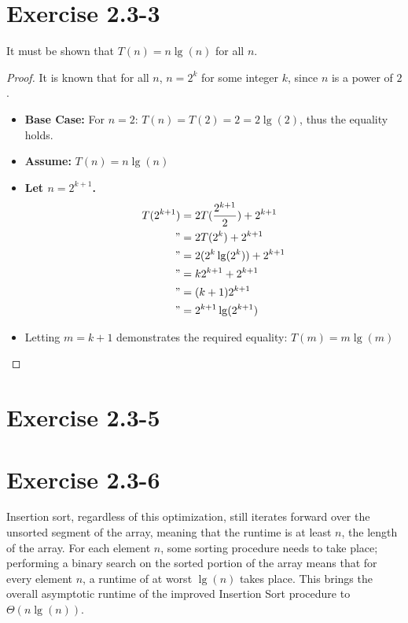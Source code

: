 \documentclass[11pt]{article}
\begin{document}
\section*{Exercise 2.3-3}
It must be shown that $T(n) = n \lg(n)$ for all $n$.
\begin{proof}
	It is known that for all $n$, $n = 2^k$ for some integer $k$, since $n$ is a power of $2$.
	\begin{itemize}
		\item{ \textbf{Base Case:} For $n = 2$: $T(n) = T(2) = 2 = 2 \lg(2)$, thus the equality holds. }
		\item{ \textbf{Assume:} $T(n) = n \lg(n)$ }
		\item{ \textbf{Let $n = 2^{k+1}$.} }
		\begin{align*}
		T(2^{k+1}) &= 2T(\frac{2^{k+1}}{2}) + 2^{k+1} \\
		" &= 2T(2^k) + 2^{k+1} \\
		" &= 2(2^k\lg(2^k)) + 2^{k+1} \\
		" &= k 2^{k+1} + 2^{k+1} \\
		" &= (k+1)2^{k+1} \\
		" &= 2^{k+1}\lg(2^{k+1}) \\
		\end{align*}
		\item{ Letting $m = k+1$ demonstrates the required equality: $ T(m) = m \lg(m) $}
	\end{itemize}
\end{proof}

\section*{Exercise 2.3-5}


\section*{Exercise 2.3-6}
Insertion sort, regardless of this optimization, still iterates forward over the unsorted segment of the array, meaning that the runtime is at least $n$, the length of the array. For each element $n$, some sorting procedure needs to take place; performing a binary search on the sorted portion of the array means that for every element $n$, a runtime of at worst $\lg(n)$ takes place. This brings the overall asymptotic runtime of the improved Insertion Sort procedure to $\Theta(n\lg(n))$.
\end{document}
